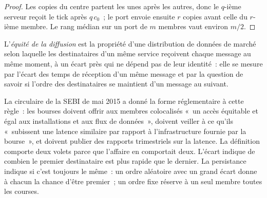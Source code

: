 \begin{proof}
Les copies du centre partent les unes après les autres, donc le $q$-ième serveur reçoit le tick après $q\,c_0$~; le port envoie ensuite $r$ copies avant
celle du $r$-ième membre. Le rang médian sur un port de $m$ membres vaut environ $m/2$.
\end{proof}

\begin{definition}\label{def:nw:the-asia-pacific-map:fair}
L'\emph{équité de la diffusion} est la propriété d'une distribution de données de marché selon laquelle les destinataires d'un même
service reçoivent chaque message au même moment, à un écart près qui ne dépend pas de leur identité~: elle se mesure par l'écart des temps de réception
d'un même message et par la question de savoir si l'ordre des destinataires se maintient d'un message au suivant.
\end{definition}

La circulaire de la SEBI de mai 2015 a donné la forme réglementaire à cette règle~: les bourses doivent offrir aux membres colocalisés «~un accès équitable et égal aux
installations et aux flux de données~», doivent veiller à ce qu'ils «~subissent une latence similaire par rapport à l'infrastructure fournie par la bourse~»,
et doivent publier des rapports trimestriels sur la latence. La définition comporte deux volets parce que l'affaire en comportait deux. L'écart indique de combien
le premier destinataire est plus rapide que le dernier. La persistance indique si c'est toujours le même~: un ordre aléatoire avec un grand écart donne à chacun
la chance d'être premier~; un ordre fixe réserve à un seul membre toutes les courses.

\label{lst:nw:the-asia-pacific-map:unicast}

